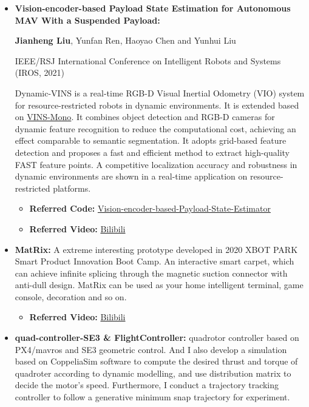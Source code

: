 \documentclass[11pt,a4paper,sans]{moderncv}        %
\begin{document}
{\begin{itemize}
\item \textbf{Vision-encoder-based Payload State Estimation for Autonomous MAV With a Suspended Payload:} 

\textbf{Jianheng Liu}, Yunfan Ren, Haoyao Chen and Yunhui Liu

IEEE/RSJ International Conference on Intelligent Robots and Systems (IROS, 2021)

Dynamic-VINS is a real-time RGB-D Visual Inertial Odometry (VIO) system for resource-restricted robots in dynamic environments. It is extended based on \href{https://github.com/HKUST-Aerial-Robotics/VINS-Mono}{VINS-Mono}. It combines object detection and RGB-D cameras for dynamic feature recognition to reduce the computational cost, achieving an effect comparable to semantic segmentation. It adopts grid-based feature detection and proposes a fast and efficient method to extract high-quality FAST feature points. A competitive localization accuracy and robustness in dynamic environments are shown in a real-time application on  resource-restricted platforms. 

\begin{itemize}
\item \textbf{Referred Code:} \href{https://github.com/jianhengLiu/Vision-encoder-based-Payload-State-Estimator}{Vision-encoder-based-Payload-State-Estimator}
\item \textbf{Referred Video:} \href{https://www.bilibili.com/video/BV1Qq4y1U7n4?share_source=copy_web}{Bilibili}
\end{itemize}
\vspace{6pt}

\item \textbf{MatRix:} A extreme interesting prototype developed in 2020 XBOT PARK Smart Product Innovation Boot Camp. An interactive smart carpet, which can achieve infinite splicing through the magnetic suction connector with anti-dull design. MatRix can be used as your home intelligent terminal, game console, decoration and so on.

\begin{itemize}
\item \textbf{Referred Video:} \href{https://www.bilibili.com/video/BV1gb4y127by?share_source=copy_web}{Bilibili}
\end{itemize}

\vspace{6pt}

\item \textbf{quad-controller-SE3 \& FlightController:} quadrotor controller based on PX4/mavros and SE3 geometric control. And I also develop a simulation based on CoppeliaSim software to compute the desired thrust and torque of quadroter according to dynamic modelling, and use distribution matrix to decide the motor's speed. Furthermore, I conduct a trajectory tracking controller to follow a generative minimum snap trajectory for experiment.


\end{itemize}}
\end{document}
